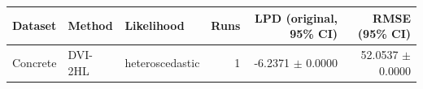 \begin{tabular}{lllrrr}
\toprule
Dataset & Method & Likelihood & Runs & LPD (original, 95\% CI) & RMSE (95\% CI) \\
\midrule
Concrete & DVI-2HL & heteroscedastic & 1 & -6.2371 $\pm$ 0.0000 & 52.0537 $\pm$ 0.0000 \\
\bottomrule
\end{tabular}
